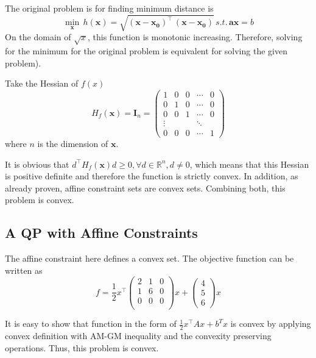 The original problem is for finding minimum distance is
\[
\min_\mathbf{x}\,h(\mathbf{x})=\sqrt{\mathbf{(x-x_0)^\intercal\,(x-x_0)}}\,s.t.\,\mathbf{ax} = b
\]
On the domain of $\sqrt x$, this function is monotonic increasing. Therefore, solving for the minimum for the original problem is equivalent for solving the given problem). 

Take the Hessian of $f(x)$
\[
H_f(\mathbf{x}) = \mathbf{I}_n =                       \left(\begin{array}{ccccc}
                             1&0&0&\cdots &0\\
                             0&1&0&\cdots &0\\
                             0&0&1&\cdots &0\\
                             \vdots&&&\ddots&\\
                             0&0&0&\cdots &1
                      \end{array}\right)
\]
where $n$ is the dimension of $\mathbf{x}$.

It is obvious that $d^\intercal H_f(\mathbf{x}) d \geq 0, \forall d \in \mathbb{R}^n, d \neq 0$, which means that this Hessian is positive definite and therefore the function is strictly convex. In addition, as already proven, affine constraint sets are convex sets. Combining both, this problem is convex.


\subsection{A QP with Affine Constraints}

The affine constraint here defines a convex set. The objective function can be written as
\[
f = \frac{1}{2}x^\intercal\left(
\begin{array}{ccc}
     2 & 1 & 0\\
     1 & 6 & 0\\
     0 & 0 & 0\\
\end{array}
\right)
x + \left(
\begin{array}{c}
     4 \\ 5 \\ 6
\end{array}
\right)x
\]

It is easy to show that function in the form of $\frac{1}{2}x^\intercal A x + b^Tx$ is convex by applying convex definition with AM-GM inequality and the convexity preserving operations. Thus, this problem is convex.



